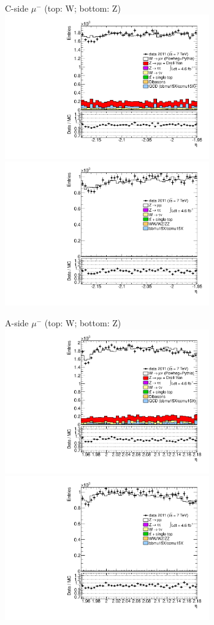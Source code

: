 {{
C-side $\mu^{-}$ (top: W; bottom: Z)
\centering
\includegraphics[width=0.66\textwidth]{dates/20130306/figures/etaphi/WpDtoH_10_C_stack_l_eta_NEG} \\
\includegraphics[width=0.66\textwidth]{dates/20130306/figures/etaphi/Z_10_C_stack_lN_eta_ALL.pdf}

A-side $\mu^{-}$ (top: W; bottom: Z)
\centering
\includegraphics[width=0.66\textwidth]{dates/20130306/figures/etaphi/WpDtoH_10_A_stack_l_eta_NEG} \\
\includegraphics[width=0.66\textwidth]{dates/20130306/figures/etaphi/Z_10_A_stack_lN_eta_ALL.pdf} 

}}
